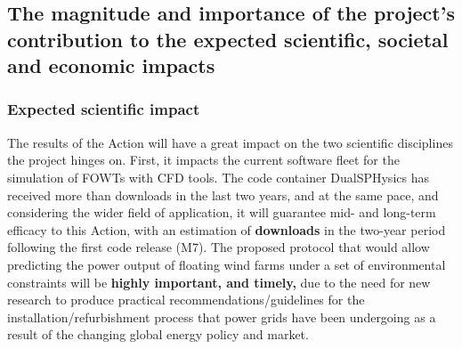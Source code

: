 \begin{table}[h!]
\centering
\caption{\small Dissemination and outreach activities of the Action. \emph{When} indicates the scheduled month.}\vspace{0.5ex}
\label{tab:outreach}
\def\arraystretch{1.2}
\scriptsize{

}
\vspace{-4ex}
\end{table}


\subsection{The magnitude and importance of the project’s contribution to the expected scientific, societal and economic impacts}

\vspace{-1ex}\subsubsection*{Expected scientific impact}\vspace{-1ex}
The results of the Action will have a great impact on  the two scientific disciplines the project hinges on. First, it impacts the current software fleet for the simulation of FOWTs with CFD tools. The code container DualSPHysics has received more than  downloads in the last two years, and at the same pace, and considering the wider field of application, it will guarantee mid- and long-term efficacy to this Action, with an estimation of \textbf{ downloads} in the two-year period following the first code release (M7). The proposed protocol that would allow predicting the power output of floating wind farms under a set of environmental constraints will be \textbf{highly important, and timely,} due to the need for new research to produce practical recommendations/guidelines for the installation/refurbishment process that power grids have been undergoing as a result of the changing global energy policy and market.




